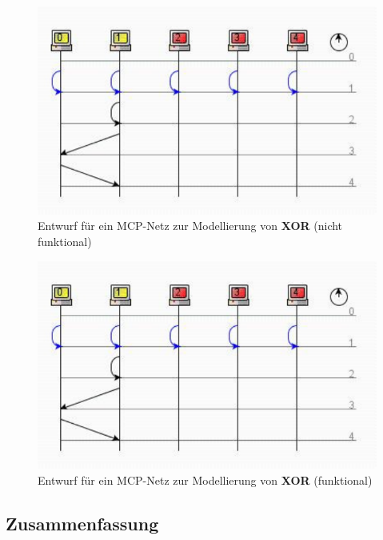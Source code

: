 {\begin{figure}[h]
    \centering
    \includegraphics{images/p1ReadSeq.pdf}
    \caption{Entwurf für ein MCP-Netz zur Modellierung von \textbf{XOR} (nicht funktional)}
    \label{fig-mcpxornf}
\end{figure}

\begin{figure}[h]
    \centering
    \includegraphics{images/p1ReadSeq.pdf}
    \caption{Entwurf für ein MCP-Netz zur Modellierung von \textbf{XOR} (funktional)}
    \label{fig-mcpxorf}
\end{figure}




\clearpage
\pagebreak


\subsection{Zusammenfassung}\label{mcp-summary}}

